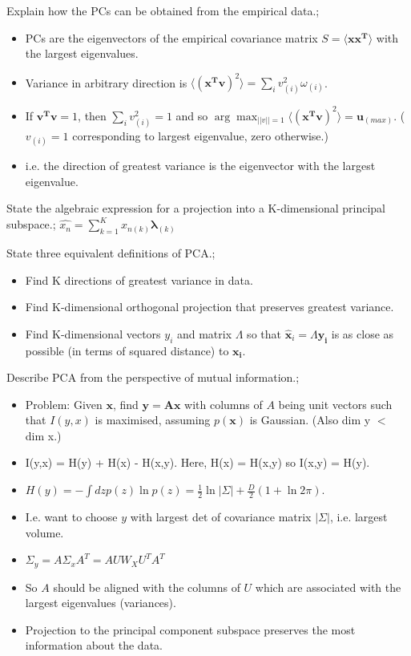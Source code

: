 \documentclass{article}
\begin{document}
Explain how the PCs can be obtained from the empirical data.; \begin{itemize} \item PCs are the eigenvectors of the empirical covariance matrix $S=\langle\mathbf{xx^T}\rangle$ with the largest eigenvalues.  \item Variance in arbitrary direction is $\langle (\mathbf{x^Tv})^2\rangle =\sum_i v_{(i)}^2\omega_{(i)}$.  \item If $\mathbf{v^Tv}=1$, then $\sum_i v_{(i)}^2=1$ and so $\arg\max_{||v||=1} \langle (\mathbf{x^Tv})^2\rangle = \mathbf{u}_{(max)}$. ($v_{(i)}=1$ corresponding to largest eigenvalue, zero otherwise.) \item i.e. the direction of greatest variance is the eigenvector with the largest eigenvalue.  \end{itemize}

State the algebraic expression for a projection into a K-dimensional principal subspace.; $\hat{x_n} = \sum_{k=1}^K x_{n(k)}\mathbf{\lambda}_{(k)}$

State three equivalent definitions of PCA.; \begin{itemize} \item Find K directions of greatest variance in data.  \item Find K-dimensional orthogonal projection that preserves greatest variance.  \item Find K-dimensional vectors $y_i$ and matrix $\Lambda$ so that $\hat{\mathbf{x}}_i = \Lambda\mathbf{y_i}$ is as close as possible (in terms of squared distance) to $\mathbf{x_i}$.  \end{itemize}

Describe PCA from the perspective of mutual information.; \begin{itemize} \item Problem: Given $\mathbf{x}$, find $\mathbf{y = Ax}$ with columns of $A$ being unit vectors such that $I(y,x)$ is maximised, assuming $p(\mathbf{x})$ is Gaussian. (Also dim y $<$ dim x.) \item I(y,x) = H(y) + H(x) - H(x,y). Here, H(x) = H(x,y) so I(x,y) = H(y).  \item $H(y)=-\int dz p(z) \ln p(z) = \frac{1}{2}\ln|\Sigma|+\frac{D}{2}(1+\ln 2\pi )$.  \item I.e. want to choose $y$ with largest det of covariance matrix $|\Sigma|$, i.e. largest volume.  \item $\Sigma_y = A\Sigma_x A^T = AUW_XU^TA^T$ \item So $A$ should be aligned with the columns of $U$ which are associated with the largest eigenvalues (variances).  \item Projection to the principal component subspace preserves the most information about the data.  \end{itemize}
\end{document}
